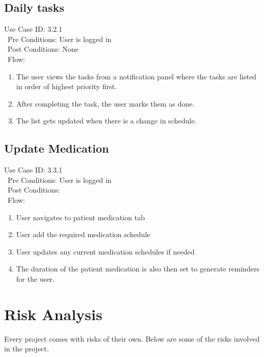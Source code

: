 \subsection{Daily tasks} 
Use Case ID: 3.2.1\\\
Pre Conditions: User is logged in\\\
Post Conditions: None\\\
Flow: 
\begin{enumerate}
    \item The user views the tasks from a notification panel where the tasks are listed in order of highest priority first. 
    \item After completing the task, the user marks them as done. 
    \item The list gets updated when there is a change in schedule.
\end{enumerate}
\subsection{Update Medication} 
Use Case ID: 3.3.1\\\
Pre Conditions: User is logged in\\\
Post Conditions:\\\
Flow:
\begin{enumerate}
    \item User navigates to patient medication tab
    \item User add the required medication schedule
    \item User updates any current medication schedules if needed
    \item The duration of the patient medication is also then set to generate reminders for the user.
\end{enumerate}

\section{Risk Analysis}
Every project comes with risks of their own. Below are some of the risks involved in the project.
